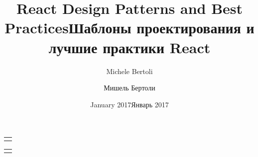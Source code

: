 \author{Michele Bertoli}
\title{React Design Patterns and Best Practices}
\date{January 2017}

\makeatletter
\renewcommand{\maketitle}{
   \begin{titlepage}
     \begin{center}
       \large
       {\LARGE\@title}
       \par\vspace{1ex}
       \begin{tabular}[t]{c}
         \@author
       \end{tabular}
       \vfill
       \@date
     \end{center}
     \@thanks
   \end{titlepage}
}
\makeatother
\maketitle


\author{Мишель Бертоли}
\title{Шаблоны проектирования и лучшие практики React}
\date{Январь 2017} 

\makeatletter
\renewcommand{\maketitle}{
   \begin{titlepage}
     \begin{center}
       \large
       {\LARGE\@title}
       \par\vspace{1ex}
       \begin{tabular}[t]{c}
         \@author
       \end{tabular}
       \vfill
       \@date
     \end{center}
     \@thanks
   \end{titlepage}
}
\makeatother
\maketitle


